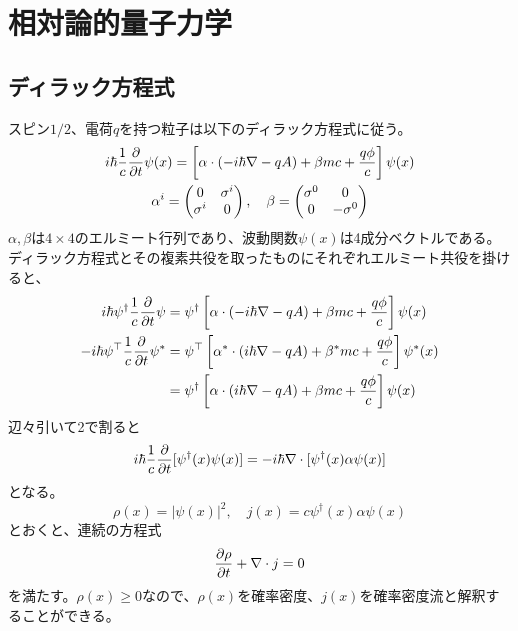 \section{相対論的量子力学}

\subsection{ディラック方程式}
    スピン$1/2$、電荷$q$を持つ粒子は以下のディラック方程式に従う。
    \begin{gather*}
        i\hbar\frac{1}{c}\pdv{t}\psi(x) = \left[\alpha \cdot (-i\hbar\nabla - qA) + \beta mc + \frac{q\phi}{c}\right]\psi(x)\\
        \alpha^i = \begin{pmatrix}
            0 & \sigma^i\\
            \sigma^i & 0
        \end{pmatrix}, \quad
        \beta = \begin{pmatrix}
            \sigma^0 & 0\\
            0 & -\sigma^0
        \end{pmatrix}
    \end{gather*}
    $\alpha, \beta$は$4 \times 4$のエルミート行列であり、波動関数$\psi(x)$は4成分ベクトルである。ディラック方程式とその複素共役を取ったものにそれぞれエルミート共役を掛けると、
    \begin{align*}
        i\hbar \psi^\dagger\frac{1}{c}\pdv{t}\psi
            &= \psi^\dagger \left[\alpha \cdot (-i\hbar\nabla - qA) + \beta mc + \frac{q\phi}{c}\right] \psi(x)\\
        -i\hbar \psi^\top\frac{1}{c}\pdv{t}\psi^*
            &= \psi^\top \left[\alpha^* \cdot (i\hbar\nabla - qA) + \beta^* mc + \frac{q\phi}{c}\right] \psi^*(x)\\
            &= \psi^\dagger \left[\alpha \cdot (i\hbar\nabla - qA) + \beta mc + \frac{q\phi}{c}\right] \psi(x)
    \end{align*}
    辺々引いて2で割ると
        \[i\hbar\frac{1}{c}\pdv{t}[\psi^\dagger(x)\psi(x)] = -i\hbar\nabla \cdot [\psi^\dagger(x) \alpha \psi(x)]\]
    となる。
        \[\rho(x) = |\psi(x)|^2, \quad j(x) = c \psi^\dagger(x)\alpha\psi(x)\]
    とおくと、連続の方程式
        \[\pdv{\rho}{t} + \nabla \cdot j = 0\]
    を満たす。$\rho(x) \geq 0$なので、$\rho(x)$を確率密度、$j(x)$を確率密度流と解釈することができる。

